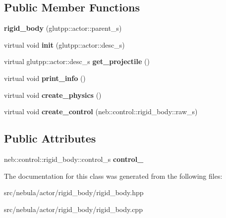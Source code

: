 \subsection*{Public Member Functions}
\begin{DoxyCompactItemize}
\item 
\hypertarget{classneb_1_1actor_1_1rigid__body_1_1rigid__body_a5a924b2a8e54ad98d10ba4552df05e96}{
{\bfseries rigid\_\-body} (glutpp::actor::parent\_\-s)}
\label{classneb_1_1actor_1_1rigid__body_1_1rigid__body_a5a924b2a8e54ad98d10ba4552df05e96}

\item 
\hypertarget{classneb_1_1actor_1_1rigid__body_1_1rigid__body_ac75f19f660a36f1c9696a1b57a79b427}{
virtual void {\bfseries init} (glutpp::actor::desc\_\-s)}
\label{classneb_1_1actor_1_1rigid__body_1_1rigid__body_ac75f19f660a36f1c9696a1b57a79b427}

\item 
\hypertarget{classneb_1_1actor_1_1rigid__body_1_1rigid__body_a30dd3dffbb06b8d8983385d41c18ca91}{
virtual glutpp::actor::desc\_\-s {\bfseries get\_\-projectile} ()}
\label{classneb_1_1actor_1_1rigid__body_1_1rigid__body_a30dd3dffbb06b8d8983385d41c18ca91}

\item 
\hypertarget{classneb_1_1actor_1_1rigid__body_1_1rigid__body_ab6183e614610c9368f322f6d9377b050}{
virtual void {\bfseries print\_\-info} ()}
\label{classneb_1_1actor_1_1rigid__body_1_1rigid__body_ab6183e614610c9368f322f6d9377b050}

\item 
\hypertarget{classneb_1_1actor_1_1rigid__body_1_1rigid__body_a29d8a1f7b3231dca13f24e64fbd3a109}{
virtual void {\bfseries create\_\-physics} ()}
\label{classneb_1_1actor_1_1rigid__body_1_1rigid__body_a29d8a1f7b3231dca13f24e64fbd3a109}

\item 
\hypertarget{classneb_1_1actor_1_1rigid__body_1_1rigid__body_a959791e326db6f8976a6219d37c08aea}{
virtual void {\bfseries create\_\-control} (neb::control::rigid\_\-body::raw\_\-s)}
\label{classneb_1_1actor_1_1rigid__body_1_1rigid__body_a959791e326db6f8976a6219d37c08aea}

\end{DoxyCompactItemize}
\subsection*{Public Attributes}
\begin{DoxyCompactItemize}
\item 
\hypertarget{classneb_1_1actor_1_1rigid__body_1_1rigid__body_aafc4f2c86d01d1ee503953f7c22020ab}{
neb::control::rigid\_\-body::control\_\-s {\bfseries control\_\-}}
\label{classneb_1_1actor_1_1rigid__body_1_1rigid__body_aafc4f2c86d01d1ee503953f7c22020ab}

\end{DoxyCompactItemize}


The documentation for this class was generated from the following files:\begin{DoxyCompactItemize}
\item 
src/nebula/actor/rigid\_\-body/rigid\_\-body.hpp\item 
src/nebula/actor/rigid\_\-body/rigid\_\-body.cpp\end{DoxyCompactItemize}
